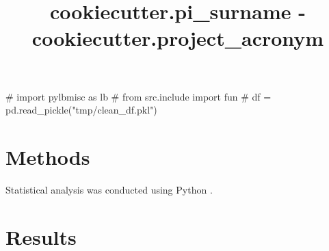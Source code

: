 \documentclass{article}
\begin{document}
\title{ {{cookiecutter.pi_surname}} - {{cookiecutter.project_acronym}} }
\maketitle
\tableofcontents
\begin{pycode}
# import pylbmisc as lb
# from src.include import fun
# df = pd.read_pickle("tmp/clean_df.pkl")

\end{pycode}


\section{Methods}


Statistical analysis was conducted using Python \cite{python}.

\section{Results}






\printbibliography 
\end{document}

